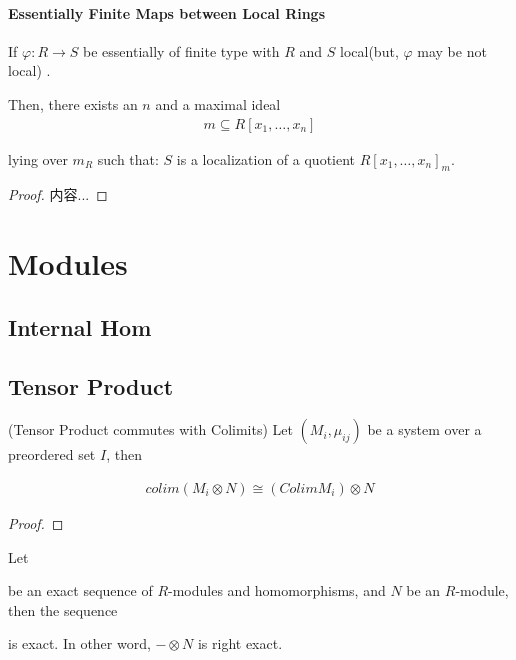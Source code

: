 \documentclass[Total.tex]{subfiles}
\begin{document}
				\subsubsection{Essentially Finite Maps between Local Rings}
					\begin{lemma}
						If $\varphi:R\rightarrow S$ be essentially of finite type with $R$ and $S$ local(but, $\varphi$ may be not local) .
						
						Then, there exists an $n$ and a maximal ideal
						\begin{gather*}
							m\subseteq R[x_1,\dots,x_n]
						\end{gather*}
						
						lying over $m_R$ such that: $S$ is a localization of a quotient $R[x_1,\dots,x_n]_m$.
					\end{lemma}
					\begin{proof}
						内容...
					\end{proof}
					
	\chapter{Modules}
		\section{Internal Hom}
		\section{Tensor Product}
			
			\begin{Def}
			\end{Def}
			
			\begin{lemma}
				(Tensor Product commutes with Colimits) Let $(M_i,\mu_{ij})$ be a system over a preordered set $I$, then  
				
				\begin{gather*}
					colim(M_i\otimes N) \cong (Colim M_i)\otimes N
				\end{gather*}
			\end{lemma}
			
			\begin{proof}
			\end{proof}
			
			\begin{lemma}
				Let  be an exact sequence of $R$-modules and homomorphisms, and $N$ be an $R$-module, then the sequence
				
				\begin{center}
				\end{center}
				
				is exact. In other word, $-\otimes N$ is right exact.
			\end{lemma}
			
\end{document}
